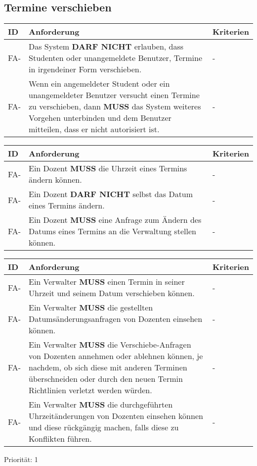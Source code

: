 \newpage

\subsection{Termine verschieben}

\begin{tabular} {|p{}|p{11cm}|p{}|}
	\hline
	ID & Anforderung & Kriterien \\
	\hline
	FA-
	& Das System \textbf{DARF NICHT} erlauben, dass Studenten oder unangemeldete Benutzer, Termine in irgendeiner Form verschieben. 
	& - \\
	\hline
	FA-
	& Wenn ein angemeldeter Student oder ein unangemeldeter Benutzer versucht einen Termine zu verschieben, dann \textbf{MUSS} das System weiteres Vorgehen unterbinden und dem Benutzer mitteilen, dass er nicht autorisiert ist.
	& - \\ 
	\hline
\end{tabular}

\begin{tabular} {|p{}|p{11cm}|p{}|}
	\hline
	ID & Anforderung & Kriterien \\
	\hline
	FA-
	& Ein Dozent \textbf{MUSS} die Uhrzeit eines Termins ändern können.
	& - \\
	\hline
	FA-
	& Ein Dozent \textbf{DARF NICHT} selbst das Datum eines Termins ändern.
	& - \\
	\hline
	FA-
	& Ein Dozent \textbf{MUSS} eine Anfrage zum Ändern des Datums eines Termins an die Verwaltung stellen können.
	& - \\
	\hline
\end{tabular}

\begin{tabular} {|p{}|p{11cm}|p{}|}
	\hline
	ID & Anforderung & Kriterien \\
	\hline
	FA-
	& Ein Verwalter \textbf{MUSS} einen Termin in seiner Uhrzeit und seinem Datum verschieben können.
	& - \\
	\hline
	FA-
	& Ein Verwalter \textbf{MUSS} die gestellten Datumsänderungsanfragen von Dozenten einsehen können.
	& - \\
	\hline
	FA-
	& Ein Verwalter \textbf{MUSS} die Verschiebe-Anfragen von Dozenten annehmen oder ablehnen können, je nachdem, ob sich diese mit anderen Terminen überschneiden oder durch den neuen Termin Richtlinien verletzt werden würden.
	& - \\
	\hline
	FA-
	& Ein Verwalter \textbf{MUSS} die durchgeführten Uhrzeitänderungen von Dozenten einsehen können und diese rückgängig machen, falls diese zu Konflikten führen.
	& - \\
	\hline
\end{tabular}
Priorität: 1

